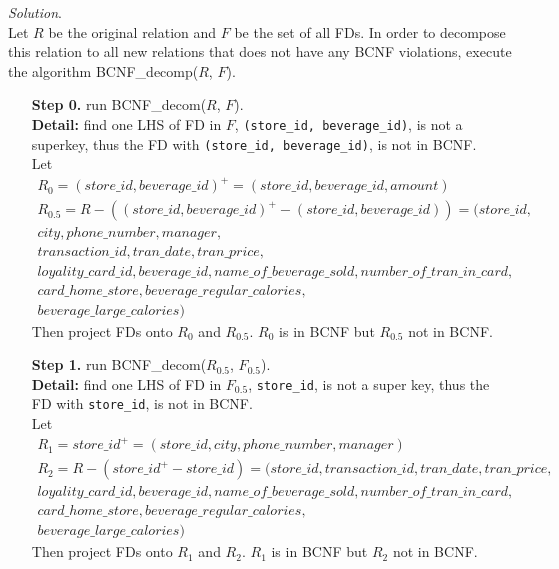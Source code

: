 \documentclass[10pt]{article}
\begin{document}
\begin{enumerate}
\begin{enumerate}
        \begin{mdframed}[leftmargin=-6.5mm]
        \textit{Solution}.\\
        Let $R$ be the original relation and $F$ be the set of all FDs. In order to decompose this relation to all new relations that does not have any BCNF violations, execute the algorithm BCNF\_decomp($R$, $F$).\\
        \begin{itemize}[leftmargin=16mm]
            \item [\textbf{Step 0. }]run BCNF\_decom($R$, $F$).\\
            \textbf{Detail:} find one LHS of FD in $F$, \texttt{(store\_id, beverage\_id)}, is not a superkey, thus the FD with \texttt{(store\_id, beverage\_id)}, is not in BCNF.\\
            Let
            \begin{gather*}
                R_0 = (store\_id, beverage\_id)^+ = (store\_id, beverage\_id, amount) \\
                R_{0.5} = R - ((store\_id, beverage\_id)^+ - (store\_id, beverage\_id)) = (store\_id, \\ city, phone\_number, manager, \\
                transaction\_id, tran\_date, tran\_price, \\ loyality\_card\_id, beverage\_id, name\_of\_beverage\_sold, number\_of\_tran\_in\_card, \\ card\_home\_store, beverage\_regular\_calories, \\
                beverage\_large\_calories)
            \end{gather*}
            Then project FDs onto $R_0$ and $R_{0.5}$. $R_0$ is in BCNF but $R_{0.5}$ not in BCNF.
            
            \item [\textbf{Step 1. }]run BCNF\_decom($R_{0.5}$, $F_{0.5}$).\\
            \textbf{Detail:} find one LHS of FD in $F_{0.5}$, \texttt{store\_id}, is not a super key, thus the FD with \texttt{store\_id}, is not in BCNF.\\
            Let
            \begin{gather*}
                R_1 = store\_id^+ = (store\_id, city, phone\_number, manager) \\
                R_2 = R - (store\_id^+ - store\_id) = (store\_id, transaction\_id, tran\_date, tran\_price, \\ loyality\_card\_id, beverage\_id, name\_of\_beverage\_sold, number\_of\_tran\_in\_card, \\ card\_home\_store, beverage\_regular\_calories, \\
                beverage\_large\_calories)
            \end{gather*}
            Then project FDs onto $R_1$ and $R_2$. $R_1$ is in BCNF but $R_2$ not in BCNF.
            

\end{itemize}
\end{mdframed}
\end{enumerate}
\end{enumerate}
\end{document}
